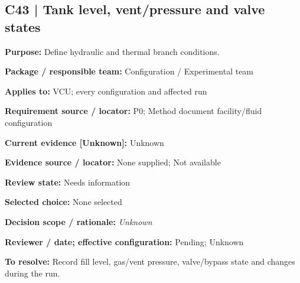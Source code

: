 \documentclass[11pt]{article}
\begin{document}
\par\noindent\begin{minipage}{\textwidth}\small\setlength{\parskip}{2pt}
\subsection*{C43 | Tank level, vent/pressure and valve states}
\textbf{Purpose:} Define hydraulic and thermal branch conditions.\par
\textbf{Package / responsible team:} Configuration / Experimental team\par
\textbf{Applies to:} VCU; every configuration and affected run\par
\textbf{Requirement source / locator:} P0; Method document facility/fluid configuration\par
\textbf{Current evidence [Unknown]:} Unknown\par
\textbf{Evidence source / locator:} None supplied; Not available\par
\textbf{Review state:} Needs information\par
\textbf{Selected choice:} None selected\par
\textbf{Decision scope / rationale:} \textit{Unknown}\par
\textbf{Reviewer / date; effective configuration:} Pending; Unknown\par
\textbf{To resolve:} Record fill level, gas/vent pressure, valve/bypass state and changes during the run.\par
\end{minipage}\par\vspace{5pt}
\end{document}
